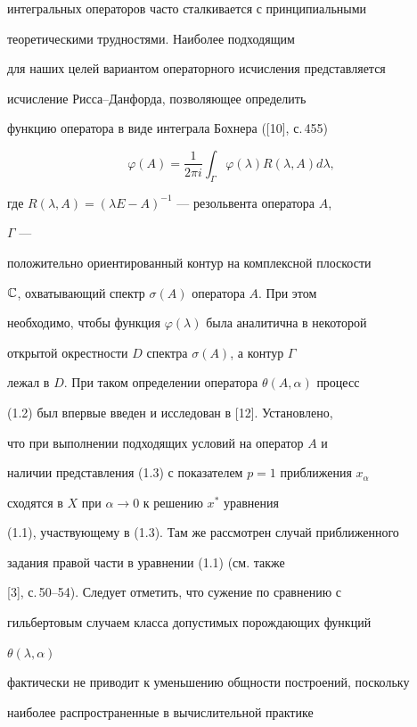 интегральных операторов часто сталкивается с принципиальными 


теоретическими трудностями. Наиболее подходящим 


для наших целей вариантом операторного исчисления представляется 


исчисление Рисса--Данфорда, позволяющее определить 


функцию оператора в виде интеграла Бохнера ([10], с.\,455) 


\begin{equation} 


\varphi(A)=\frac{1}{2\pi i}\int_\Gamma \varphi(\lambda) 


R(\lambda,A)d\lambda, 


\end{equation} 


где $R(\lambda,A)=(\lambda E-A)^{-1}$ --- резольвента оператора $A$, 


$\Gamma$ --- 


положительно ориентированный контур на комплексной плоскости 


$\Bbb C$, охватывающий спектр $\sigma(A)$ оператора $A$. При этом 


необходимо, чтобы функция $\varphi(\lambda)$ была аналитична в некоторой 


открытой окрестности $D$ спектра $\sigma(A)$, а контур $\Gamma$ 


лежал в $D$. При таком определении оператора $\theta(A,\alpha)$ процесс 


(1.2) был впервые введен и исследован в [12]. Установлено, 


что при выполнении подходящих условий на оператор $A$ и 


наличии представления (1.3) с показателем $p=1$ приближения $x_\alpha$ 


сходятся в $X$ при $\alpha\to0$ к решению $x^*$ уравнения 


(1.1), участвующему в (1.3). Там же рассмотрен случай приближенного 


задания правой части в уравнении (1.1) (см. также 


[3], с.\,50--54). Следует отметить, что сужение по сравнению с 


гильбертовым случаем класса допустимых порождающих функций 


$\theta(\lambda,\alpha)$ 


фактически не приводит к уменьшению общности построений, поскольку 


наиболее распространенные в вычислительной практике 


